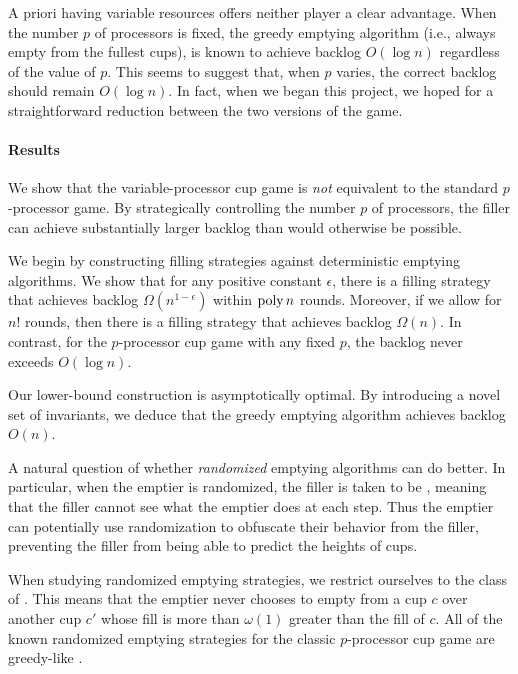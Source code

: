 A priori having variable resources offers neither player a clear advantage. When the number $p$ of processors is fixed, the greedy emptying algorithm (i.e., always empty from the fullest cups), is known to achieve backlog $O(\log n)$ \cite{AdlerBeFr03, BenderFaKu19, Kuszmaul20} regardless of the value of $p$. This seems to suggest that, when $p$ varies, the correct backlog should remain $O(\log n)$. In fact, when we began this project, we hoped for a straightforward reduction between the two versions of the game.

\paragraph{Results}
We show that the variable-processor cup game is \emph{not} equivalent to the standard $p$-processor game. By strategically controlling the number $p$ of processors, the filler can achieve substantially larger backlog than would otherwise be possible.

We begin by constructing filling strategies against deterministic emptying algorithms. We show that for any positive constant $\epsilon$, there is a filling strategy that achieves backlog $\Omega(n^{1 - \epsilon})$ within $\operatorname{\text{poly}} n$ rounds. Moreover, if we allow for $n!$ rounds, then there is a filling strategy that achieves backlog $\Omega(n)$. In contrast, for the $p$-processor cup game with any fixed $p$, the backlog never exceeds $O(\log n)$.

Our lower-bound construction is asymptotically optimal. By introducing a novel set of invariants, we deduce that the greedy emptying algorithm achieves backlog $O(n)$.

A natural question of whether \emph{randomized} emptying algorithms can do better. In particular, when the emptier is randomized, the filler is taken to be , meaning that the filler cannot see what the emptier does at each step. Thus the emptier can potentially use randomization to obfuscate their behavior from the filler, preventing the filler from being able to predict the heights of cups.

When studying randomized emptying strategies, we restrict ourselves to the class of . This means that the emptier never chooses to empty from a cup $c$ over another cup $c'$ whose fill is more than $\omega(1)$ greater than the fill of $c$. All of the known randomized emptying strategies for the classic $p$-processor cup game are greedy-like \cite{BenderFaKu19, Kuszmaul20}.

